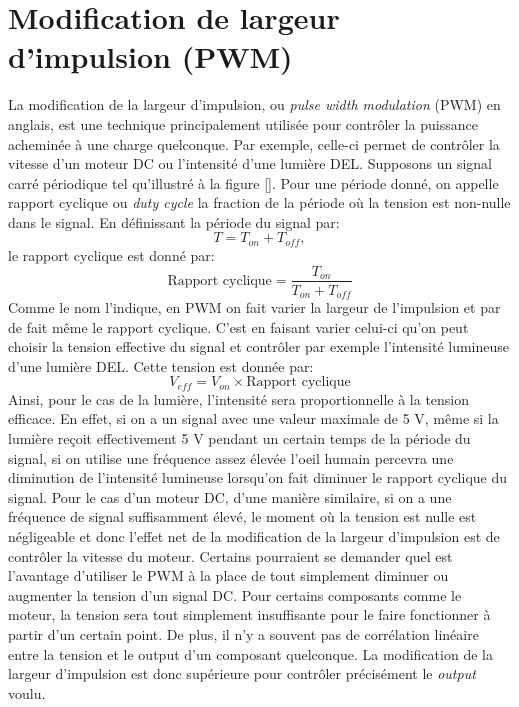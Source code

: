 \documentclass[canadien,12pt,oneside,letterpaper]{article}
\begin{document}
\section{Modification de largeur d'impulsion (PWM)}
La modification de la largeur d'impulsion, ou \textit{pulse width modulation} (PWM) en anglais, est une technique principalement utilisée pour contrôler la puissance acheminée à une charge quelconque. Par exemple, celle-ci permet de contrôler la vitesse d'un moteur DC ou l'intensité d'une lumière DEL. Supposons un signal carré périodique tel qu'illustré à la figure []. Pour une période donné, on appelle rapport cyclique ou \textit{duty cycle} la fraction de la période où la tension est non-nulle dans le signal. En définissant la période du signal par:
$$T = T_{on} + T_{off},$$
le rapport cyclique est donné par:
$$\text{Rapport cyclique} = \frac{T_{on}}{T_{on} + T_{off}}$$
Comme le nom l'indique, en PWM on fait varier la largeur de l'impulsion et par de fait même le rapport cyclique. C'est en faisant varier celui-ci qu'on peut choisir la tension effective du signal et contrôler par exemple l'intensité lumineuse d'une lumière DEL. Cette tension est donnée par:
$$V_{eff} = V_{on} \times \text{Rapport cyclique}$$
Ainsi, pour le cas de la lumière, l'intensité sera proportionnelle à la tension efficace. En effet, si on a un signal avec une valeur maximale de 5 V, même si la lumière reçoit effectivement 5 V pendant un certain temps de la période du signal, si on utilise une fréquence assez élevée l'oeil humain percevra une diminution de l'intensité lumineuse lorsqu'on fait diminuer le rapport cyclique du signal. Pour le cas d'un moteur DC, d'une manière similaire, si on a une fréquence de signal suffisamment élevé, le moment où la tension est nulle est négligeable et donc l'effet net de la modification de la largeur d'impulsion est de contrôler la vitesse du moteur. Certains pourraient se demander quel est l'avantage d'utiliser le PWM à la place de tout simplement diminuer ou augmenter la tension d'un signal DC. Pour certains composants comme le moteur, la tension sera tout simplement insuffisante pour le faire fonctionner à partir d'un certain point. De plus, il n'y a souvent pas de corrélation linéaire entre la tension et le output d'un composant quelconque. La modification de la largeur d'impulsion est donc supérieure pour contrôler précisément le \textit{output} voulu. 
\end{document}
